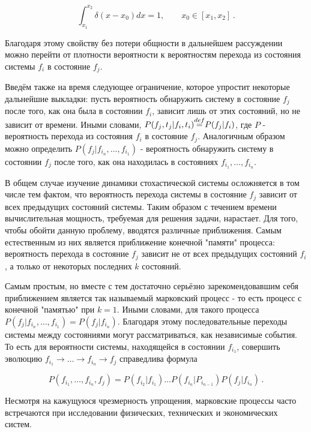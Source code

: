 \documentclass[12pt]{article}
\theoremstyle{definition}
\begin{document}
\begin{equation}
    \int_{x_1}^{x_2}\delta(x-x_0)dx = 1,\qquad x_0\in[x_1, x_2]\,.
\end{equation}

Благодаря этому свойству без потери общности в дальнейшем рассуждении можно перейти от плотности вероятности к вероятностям перехода из состояния системы $f_i$ в состояние $f_j$.

Введём также на время следующее ограничение, которое упростит некоторые дальнейшие выкладки: пусть вероятность обнаружить систему в состояние $f_j$ после того, как она была в состоянии $f_i$, зависит лишь от этих состояний, но не зависит от времени. Иными словами, $P(f_j,t_j|f_i,t_i) {\overset{def}{=}}P(f_j|f_i)$, где $P$ - вероятность перехода из состояния $f_i$ в состояние $f_j$. Аналогичным образом можно определить $P(f_j|f_{i_n},\ldots,f_{i_1})$ - вероятность обнаружить систему в состоянии $f_j$ после того, как она находилась в состояниях $f_{i_1},\ldots, f_{i_n}$. 

В общем случае изучение динамики стохастической системы осложняется в том числе тем фактом, что вероятность перехода системы в состояние $f_j$ зависит от всех предыдущих состояний системы. Таким образом с течением времени вычислительная мощность, требуемая для решения задачи, нарастает. Для того, чтобы обойти данную проблему, вводятся различные приближения. Самым естественным из них является приближение конечной "памяти" процесса: вероятность перехода в состояние $f_j$ зависит не от всех предыдущих состояний $f_i$, а только от некоторых последних $k$ состояний. 

Самым простым, но вместе с тем достаточно серьёзно зарекомендовавшим себя приближением является так называемый марковский процесс - то есть процесс с конечной "памятью" при $k=1$. Иными словами, для такого процесса $P(f_j|f_{i_n},\ldots,f_{i_1}) = P(f_j|f_{i_n})$. Благодаря этому последовательные переходы системы между состояниями могут рассматриваться, как независимые события. То есть для вероятности системы, находящейся в состоянии $f_{i_1}$, совершить эволюцию $f_{i_1}\rightarrow\ldots\rightarrow f_{i_n}\rightarrow f_j$ справедлива формула

\begin{equation}
\label{Mark_evol}
    P(f_{i_1},\ldots, f_{i_n},f_j) = P(f_{i_2}|f_{i_1})\ldots P(f_{i_n}|P_{i_{n-1}})P(f_j|f_{i_n})\,.
\end{equation}

Несмотря на кажущуюся чрезмерность упрощения, марковские процессы часто встречаются при исследовании физических, технических и экономических систем.\cite{girotti2023concentration,kato2019rfid,Schmidt2015Mark}
\end{document}

